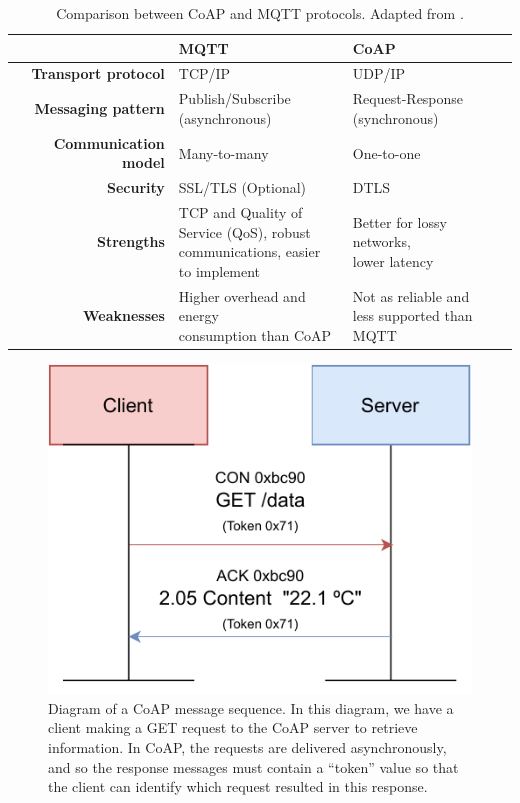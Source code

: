 \renewcommand{\arraystretch}{1.5}
\begin{table}[H]
    \centering
    \begin{tabular}{r|l|l}
        & \textbf{\acs{MQTT}}& \textbf{\acs{CoAP}}  \\ \hline
        \textbf{Transport protocol} & TCP/IP & UDP/IP \\
        \textbf{Messaging pattern} & \makecell{Publish/Subscribe \\ (asynchronous)} & \makecell{Request-Response \\ (synchronous)} \\
        \textbf{Communication model} & Many-to-many & One-to-one \\
        \textbf{Security} & SSL/TLS (Optional) & DTLS \\
        \textbf{Strengths} & \makecell{TCP and Quality of \\ Service (QoS), robust \\communications, easier \\ to implement } & \makecell{Better for lossy networks,\\ lower latency} \\
        \textbf{Weaknesses} & \makecell{Higher overhead and energy\\ consumption than \acs{CoAP}} & \makecell{Not as reliable and \\less supported than MQTT} \\
    \end{tabular}
    \caption[Comparison between \acs{CoAP} and \acs{MQTT} protocols.]{Comparison between \acs{CoAP} and \acs{MQTT} protocols. Adapted from \cite{10.5555/3161403}.}
    \label{tab:comparsion-applicationprotocols}
\end{table} 
\renewcommand{\arraystretch}{1}


\begin{figure}[H]
    \centering
    \includegraphics[width=0.5\linewidth]{images/coap message sequence diagram.pdf}
    \caption[Diagram of a \acs{CoAP} message sequence.]{ Diagram of a \acs{CoAP} message sequence. In this diagram, we have a client making a GET request to the \acs{CoAP} server to retrieve information. In \acs{CoAP}, the requests are delivered asynchronously, and so the response messages must contain a ``token'' value so that the client can identify which request resulted in this response.}
    \label{fig:coap-message-sequence-diagram}
\end{figure}

